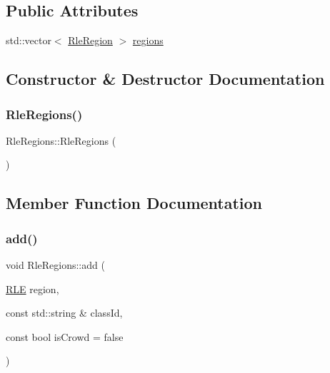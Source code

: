 \subsection*{Public Attributes}
\begin{DoxyCompactItemize}
\item 
std\+::vector$<$ \hyperlink{struct_rle_region}{Rle\+Region} $>$ \hyperlink{struct_rle_regions_a49c81f3a73376196ac33e70d2a49b867}{regions}
\end{DoxyCompactItemize}


\subsection{Constructor \& Destructor Documentation}
\mbox{\label{struct_rle_regions_af02a61ff467f90320aa1980ec6924710}} 
\subsubsection{\texorpdfstring{Rle\+Regions()}{RleRegions()}}
{\footnotesize\ttfamily Rle\+Regions\+::\+Rle\+Regions (\begin{DoxyParamCaption}{ }\end{DoxyParamCaption})}



\subsection{Member Function Documentation}
\mbox{\label{struct_rle_regions_a4d7fd1bdb03c494c5ebe66e940337a73}} 
\subsubsection{\texorpdfstring{add()}{add()}\hspace{0.1cm}{\footnotesize\ttfamily [1/2]}}
{\footnotesize\ttfamily void Rle\+Regions\+::add (\begin{DoxyParamCaption}\item[{\hyperlink{struct_r_l_e}{R\+LE}}]{region,  }\item[{const std\+::string \&}]{class\+Id,  }\item[{const bool}]{is\+Crowd = {\ttfamily false} }\end{DoxyParamCaption})}

